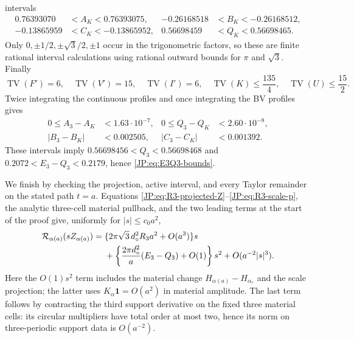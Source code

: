 intervals
\[
\begin{aligned}
0.76393070&<A_K<0.76393075,&
-0.26168518&<B_K<-0.26168512,\\
-0.13865959&<C_K<-0.13865952,&
0.56698459&<Q_K<0.56698465.
\end{aligned}
\]
Only $0,\pm1/2,\pm\sqrt3/2,\pm1$ occur in the trigonometric factors, so
these are finite rational interval calculations using rational outward
bounds for $\pi$ and $\sqrt3$.  Finally
\[
\operatorname {TV}(F')=6,\quad \operatorname {TV}(V')=15,\quad
\operatorname {TV}(I')=6,\quad
\operatorname {TV}(K)\le\frac{135}{4},\quad
\operatorname {TV}(U)\le\frac{15}{2}.
\]
Twice integrating the continuous profiles and once integrating the BV
profiles gives
\[
\begin{aligned}
0\le A_3-A_K&<1.63\cdot10^{-7},&
0\le Q_3-Q_K&<2.60\cdot10^{-8},\\
|B_3-B_K|&<0.002505,&
|C_3-C_K|&<0.001392.
\end{aligned}
\]
These intervals imply
$0.56698456<Q_3<0.56698468$ and
$0.2072<E_3-Q_3<0.2179$, hence
\eqref{JP:eq:E3Q3-bounds}.

We finish by checking the projection, active interval, and every Taylor
remainder on the stated path $t=a$.  Equations
\eqref{JP:eq:R3-projected-Z}--\eqref{JP:eq:R3-scale-p}, the analytic
three-cell material pullback, and the two leading terms at the start of
the proof give, uniformly for $|s|\le c_0a^2$,
\begin{align}
 \mathscr R_{\alpha(a)}(sZ_{\alpha(a)})
 ={}&
 \{2\pi\sqrt3\,d_\circ^2R_3a^2+O(a^3)\}s\notag\\
 &+\left\{\frac{2\pi d_\circ^2}{a}(E_3-Q_3)+O(1)\right\}s^2
 +O(a^{-2}|s|^3).
 \label{JP:eq:joint-period3-Taylor}
\end{align}
Here the $O(1)s^2$ term includes the material change
$H_{\alpha(a)}-H_{\alpha_*}$ and the scale projection; the latter uses
$K_\alpha\mathbf1=O(a^2)$ in material amplitude.  The last term follows
by contracting the third support derivative on the fixed three material
cells: its circular multipliers have total order at most two, hence its
norm on three-periodic support data is $O(a^{-2})$.

